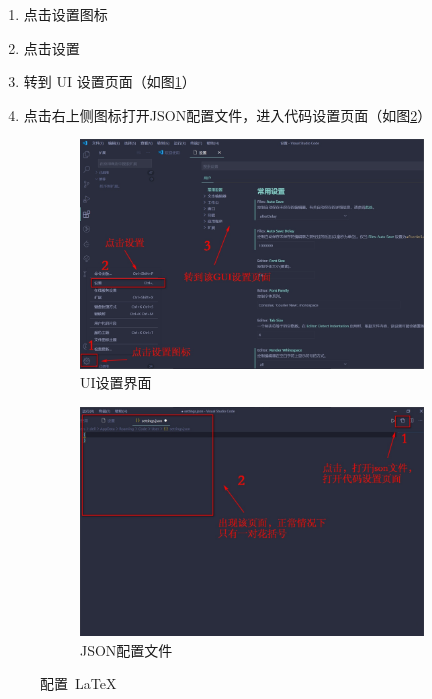 \begin{enumerate}
  \item 点击设置图标
  \item 点击设置
  \item 转到 UI 设置页面（如图\ref{fig:2-vscode-settings}）
  \item 点击右上侧图标打开JSON配置文件，进入代码设置页面（如图\ref{fig:2-vscode-json}）
\end{enumerate}

\begin{figure}[H]
  \centering
  \begin{subfigure}{0.45\textwidth}
    \includegraphics[width=\linewidth]{figures/chapter2/vscode-settings.png}
    \caption{UI设置界面}
    \label{fig:2-vscode-settings}
  \end{subfigure}\qquad
  \begin{subfigure}{0.45\textwidth}
    \includegraphics[width=\linewidth]{figures/chapter2/vscode-json.png}
    \caption{JSON配置文件}
    \label{fig:2-vscode-json}
  \end{subfigure}
  \caption{配置~\LaTeX~}
  \label{fig:2-vscode-conf}
\end{figure}

